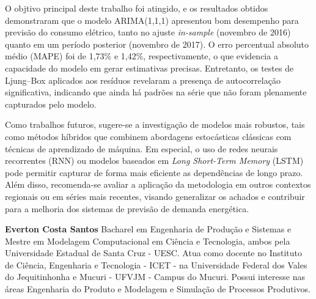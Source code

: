 \documentclass[journal]{IEEEtran}
\begin{document}
O objtivo principal deste trabalho foi atingido, e os resultados obtidos demonstraram que o modelo ARIMA(1,1,1) apresentou bom desempenho para previsão do consumo elétrico, tanto no ajuste \emph{in-sample} (novembro de 2016) quanto em um período posterior (novembro de 2017). O erro percentual absoluto médio (MAPE) foi de 1,73\% e 1,42\%, respectivamente, o que evidencia a capacidade do modelo em gerar estimativas precisas. Entretanto, os testes de Ljung--Box aplicados aos resíduos revelaram a presença de autocorrelação significativa, indicando que ainda há padrões na série que não foram plenamente capturados pelo modelo.

Como trabalhos futuros, sugere-se a investigação de modelos mais robustos, tais como métodos híbridos que combinem abordagens estocásticas clássicas com técnicas de aprendizado de máquina. Em especial, o uso de redes neurais recorrentes (RNN) ou modelos baseados em \textit{Long Short-Term Memory} (LSTM) pode permitir capturar de forma mais eficiente as dependências de longo prazo. Além disso, recomenda-se avaliar a aplicação da metodologia em outros contextos regionais ou em séries mais recentes, visando generalizar os achados e contribuir para a melhoria dos sistemas de previsão de demanda energética.





\begin{IEEEbiography}{\textbf{Everton Costa Santos}} 
Bacharel em Engenharia de Produção e Sistemas e Mestre em Modelagem Computacional em Ciência e Tecnologia, ambos pela Universidade Estadual de Santa Cruz - UESC. Atua como docente no Instituto de Ciência, Engenharia e Tecnologia - ICET - na Universidade Federal dos Vales do Jequitinhonha e Mucuri - UFVJM - Campus do Mucuri. Possui interesse nas áreas Engenharia do Produto e Modelagem e Simulação de Processos Produtivos.  
\end{IEEEbiography}
\end{document}
